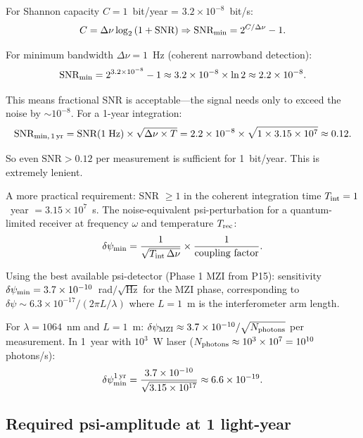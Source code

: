 \documentclass[11pt]{article}
\newcommand{\ee}[1]{\times 10^{#1}}
\begin{document}
For Shannon capacity $C = 1$~bit/year = $3.2\ee{-8}$~bit/s:
\begin{equation}
C = \Delta\nu \log_2\left(1 + \text{SNR}\right) \Rightarrow
\text{SNR}_{\rm min} = 2^{C/\Delta\nu} - 1.
\end{equation}

For minimum bandwidth $\Delta\nu = 1$~Hz (coherent narrowband detection):
\begin{equation}
\text{SNR}_{\rm min} = 2^{3.2\ee{-8}} - 1 \approx 3.2\ee{-8} \times \ln 2 \approx 2.2\ee{-8}.
\end{equation}

This means fractional SNR is acceptable---the signal needs only
to exceed the noise by $\sim 10^{-8}$. For a 1-year integration:
\begin{equation}
\text{SNR}_{\rm min,\,1\,yr} = \text{SNR}(1\;\text{Hz}) \times \sqrt{\Delta\nu \times T}
= 2.2\ee{-8} \times \sqrt{1 \times 3.15\ee{7}} \approx 0.12.
\end{equation}

So even $\text{SNR} > 0.12$ per measurement is sufficient for
1~bit/year. This is extremely lenient.

A more practical requirement: SNR $\geq 1$ in the coherent
integration time $T_{\rm int} = 1$~year $= 3.15\ee{7}$~s.
The noise-equivalent psi-perturbation for a quantum-limited
receiver at frequency $\omega$ and temperature $T_{\rm rec}$:
\begin{equation}
\delta\psi_{\rm min} = \frac{1}{\sqrt{T_{\rm int}\,\Delta\nu}}
\times \frac{1}{\text{coupling factor}}.
\end{equation}

Using the best available psi-detector (Phase 1 MZI from P15):
sensitivity $\delta\psi_{\rm min} = 3.7\ee{-10}$~rad$/\sqrt{\text{Hz}}$
for the MZI phase, corresponding to
$\delta\psi \sim 6.3\ee{-17}/(2\pi L/\lambda)$ where $L = 1$~m
is the interferometer arm length.

For $\lambda = 1064$~nm and $L = 1$~m:
$\delta\psi_{\rm MZI} \approx 3.7\ee{-10}/\sqrt{N_{\rm photons}}$
per measurement. In 1~year with $10^3$~W laser ($N_{\rm photons}
\approx 10^{3} \times 10^7 = 10^{10}$ photons/s):
\begin{equation}
\delta\psi_{\rm min}^{\rm 1\,yr} = \frac{3.7\ee{-10}}{\sqrt{3.15\ee{17}}} \approx 6.6\ee{-19}.
\end{equation}

\subsection{Required psi-amplitude at 1 light-year}
\end{document}

